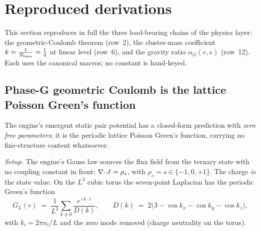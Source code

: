 \section{Reproduced derivations}
\label{sec:reproduced}

This section reproduces in full the three load-bearing chains of the physics
layer: the geometric-Coulomb theorem (row~2), the cluster-mass coefficient
$k=\tfrac{1}{N_{\mathrm{base}}}=\tfrac14$ at linear level (row~6), and the gravity ratio $\alpha_G(e,e)$
(row~12). Each uses the canonical macros; no constant is hand-keyed.

\subsection{Phase-G geometric Coulomb is the lattice Poisson Green's function}
\label{sec:geomcoulomb}

\begin{claim}
The engine's emergent static pair potential has a closed-form prediction with
\emph{zero free parameters}: it is the periodic lattice Poisson Green's function,
carrying no fine-structure content whatsoever.
\end{claim}

\emph{Setup.} The engine's Gauss law sources the flux field from the ternary
state with no coupling constant in front: $\nabla\!\cdot\!J = \rho_s$, with $\rho_s = s \in
\{-1,0,+1\}$. The charge \emph{is} the state value. On the $L^3$ cubic torus the
seven-point Laplacian has the periodic Green's function
\[
  G_L(r) \;=\; \frac{1}{L^3}\sum_{k\neq 0}\frac{e^{\,i\,k\cdot r}}{D(k)},
  \qquad D(k) \;=\; 2\bigl(3 - \cos k_x - \cos k_y - \cos k_z\bigr),
\]
with $k_i = 2\pi n_i / L$ and the zero mode removed (charge neutrality on the
torus).

